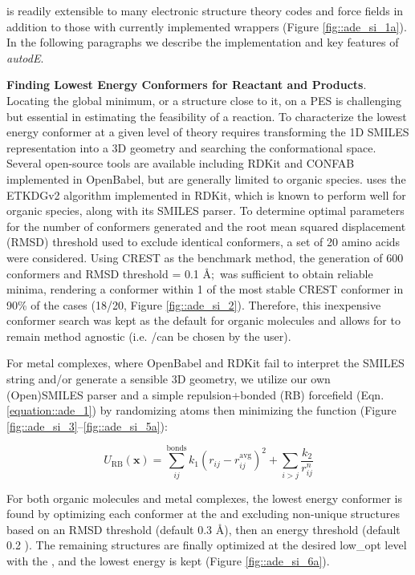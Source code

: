 \documentclass[../../main.tex]{subfiles}
\begin{document}
\ade is readily extensible to many electronic structure theory codes and force fields in addition to those with currently implemented wrappers (Figure \ref{fig::ade_si_1a}). In the following paragraphs we describe the implementation and key features of \emph{autodE}. 

{\bfseries{Finding Lowest Energy Conformers for Reactant and Products}}. Locating the global minimum, or a structure close to it, on a PES is challenging but essential in estimating the feasibility of a reaction.\cite{Chan2019} To characterize the lowest energy conformer at a given level of theory requires transforming the 1D SMILES representation into a 3D geometry and searching the conformational space. Several open-source tools are available including RDKit\cite{Landrum2019} and CONFAB\cite{OBoyle2011} implemented in OpenBabel, but are generally limited to organic species. \ade uses the ETKDGv2\cite{Riniker2015} algorithm implemented in RDKit, which is known to perform well for organic species, along with its SMILES parser.\cite{Ebejer2012} To determine optimal parameters for the number of conformers generated and the root mean squared displacement (RMSD) threshold used to exclude identical conformers, a set of 20 amino acids were considered. Using CREST\cite{Pracht2020} as the benchmark method, the generation of 600 conformers and RMSD threshold = 0.1 \AA$;$ was sufficient to obtain reliable minima, rendering a conformer within 1 \kcalx of the most stable CREST conformer in 90\% of the cases (18/20, Figure \ref{fig::ade_si_2}). Therefore, this inexpensive conformer search was kept as the default for organic molecules and allows for \ade to remain method agnostic (i.e. \lmethod/\hmethodx can be chosen by the user). 

For metal complexes, where OpenBabel and RDKit fail to interpret the SMILES string and/or generate a sensible 3D geometry, we utilize our own (Open)SMILES parser and a simple repulsion+bonded (RB) forcefield (Eqn. \eqref{equation::ade_1}) by randomizing atoms then minimizing the function (Figure \ref{fig::ade_si_3}--\ref{fig::ade_si_5a}):

\begin{equation}
	U_\text{RB}(\boldsymbol{x}) = \sum_{ij}^\text{bonds} k_1 (r_{ij} - r_{ij}^\text{avg})^2 + \sum_{i > j} \frac{k_2}{r_{ij}^n}
	\label{equation::ade_1}
\end{equation}

For both organic molecules and metal complexes, the lowest energy conformer is found by optimizing each conformer at the \lmethodx and excluding non-unique structures based on an RMSD threshold (default 0.3 \AA), then an energy threshold (default 0.2 \kcal). The remaining structures are finally optimized at the desired low\_opt level with the \hmethod, and the lowest energy is kept (Figure \ref{fig::ade_si_6a}).  
\end{document}
